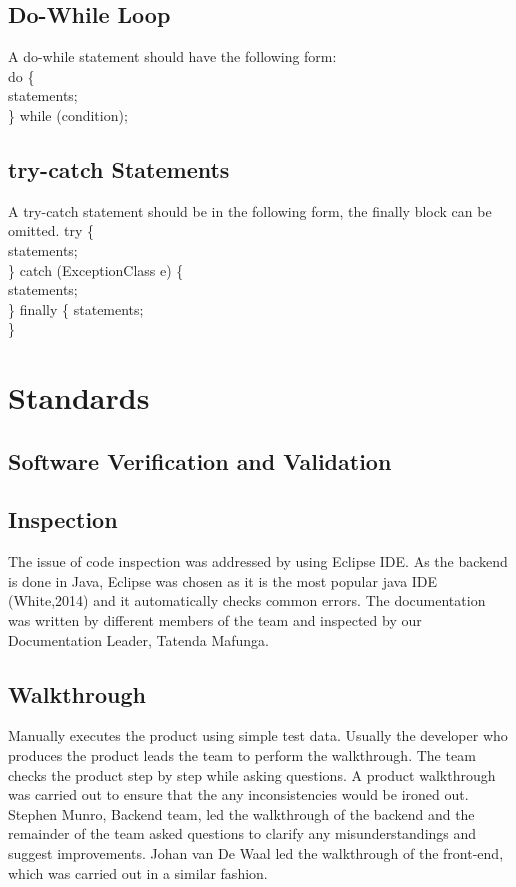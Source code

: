 \documentclass[a4paper,12pt]{report}
\begin{document}
\subsection{Do-While Loop}
A do-while statement should have the following form:\\
do \{ \\
	\indent statements; \\
\} while (condition); 
\subsection{try-catch Statements}
A try-catch statement should be in the following form, the finally block can be omitted. 
try \{ \\
	\indent statements;\\
\} catch (ExceptionClass e) \{ \\
	\indent statements;\\
\} finally \{
	\indent statements;\\
\}

\section{Standards}
\subsection{Software Verification and Validation}
\subsection{Inspection}
The issue of code inspection was addressed by using Eclipse IDE. As the backend is done in Java, Eclipse was chosen as it is the most popular java IDE (White,2014) and it automatically checks common errors. The documentation was written by different members of the team and inspected by our Documentation Leader, Tatenda Mafunga.\\
\subsection{Walkthrough}
Manually executes the product using simple test data. Usually the developer who produces the product leads the team to perform the walkthrough. The team checks the product step by step while asking questions. A product walkthrough was carried out to ensure that the any inconsistencies would be ironed out. Stephen Munro, Backend team, led the walkthrough of the backend and the remainder of the team asked questions to clarify any misunderstandings and suggest improvements. Johan van De Waal led the walkthrough of the front-end, which was carried out in a similar fashion.\\
\end{document}
